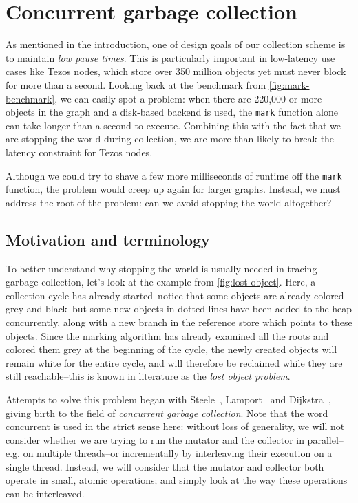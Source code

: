 \section{Concurrent garbage collection}

As mentioned in the introduction, one of design goals of our collection scheme is to maintain \emph{low pause times}. This is particularly important in low-latency use cases like Tezos nodes, which store over 350 million objects yet must never block for more than a second. Looking back at the benchmark from \cref{fig:mark-benchmark}, we can easily spot a problem: when there are 220,000 or more objects in the graph and a disk-based backend is used, the \texttt{mark} function alone can take longer than a second to execute. Combining this with the fact that we are stopping the world during collection, we are more than likely to break the latency constraint for Tezos nodes.

Although we could try to shave a few more milliseconds of runtime off the \texttt{mark} function, the problem would creep up again for larger graphs. Instead, we must address the root of the problem: can we avoid stopping the world altogether?

\subsection{Motivation and terminology}

To better understand why stopping the world is usually needed in tracing garbage collection, let's look at the example from \cref{fig:lost-object}. Here, a collection cycle has already started--notice that some objects are already colored grey and black--but some new objects in dotted lines have been added to the heap concurrently, along with a new branch in the reference store which points to these objects. Since the marking algorithm has already examined all the roots and colored them grey at the beginning of the cycle, the newly created objects will remain white for the entire cycle, and will therefore be reclaimed while they are still reachable--this is known in literature as the \emph{lost object problem}.



Attempts to solve this problem began with Steele~\cite{steele75}, Lamport~\cite{lamport76} and Dijkstra~\cite{dijkstra78}, giving birth to the field of \emph{concurrent garbage collection}. Note that the word concurrent is used in the strict sense here: without loss of generality, we will not consider whether we are trying to run the mutator and the collector in parallel--e.g. on multiple threads--or incrementally by interleaving their execution on a single thread. Instead, we will consider that the mutator and collector both operate in small, atomic operations; and simply look at the way these operations can be interleaved.

